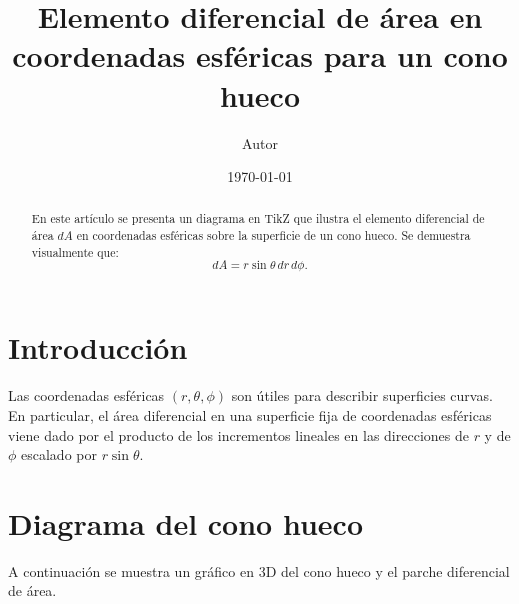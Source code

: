 \documentclass[12pt]{article}
\title{Elemento diferencial de área en coordenadas esféricas para un cono hueco}
\author{Autor}
\date{\today}
\begin{document}
\maketitle

\begin{abstract}
En este artículo se presenta un diagrama en TikZ que ilustra el elemento diferencial de área \(dA\) en coordenadas esféricas sobre la superficie de un cono hueco. Se demuestra visualmente que:
\[
dA = r\sin\theta\,dr\,d\phi.
\]
\end{abstract}

\section{Introducción}
Las coordenadas esféricas \((r,\theta,\phi)\) son útiles para describir superficies curvas. En particular, el área diferencial en una superficie fija de coordenadas esféricas viene dado por el producto de los incrementos lineales en las direcciones de \(r\) y de \(\phi\) escalado por \(r\sin\theta\).

\section{Diagrama del cono hueco}
A continuación se muestra un gráfico en 3D del cono hueco y el parche diferencial de área.
\end{document}
